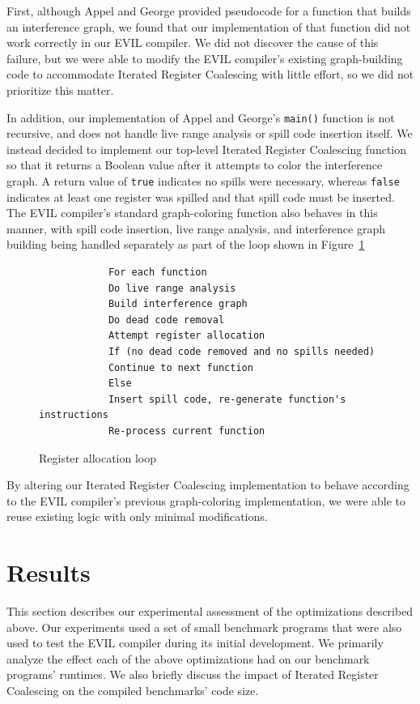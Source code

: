 \documentclass[12pt]{article}
\begin{document}
First, although Appel and George provided pseudocode for a function that builds an interference graph, we found that our implementation of that function did not work correctly in our EVIL compiler.
We did not discover the cause of this failure, but we were able to modify the EVIL compiler's existing graph-building code to accommodate Iterated Register Coalescing with little effort, so we did not prioritize this matter.

In addition, our implementation of Appel and George's {\tt main()} function is not recursive, and does not handle live range analysis or spill code insertion itself.
We instead decided to implement our top-level Iterated Register Coalescing function so that it returns a Boolean value after it attempts to color the interference graph.
A return value of {\tt true} indicates no spills were necessary, whereas {\tt false} indicates at least one register was spilled and that spill code must be inserted.
The EVIL compiler's standard graph-coloring function also behaves in this manner, with spill code insertion, live range analysis, and interference graph building being handled separately as part of the loop shown in Figure~\ref{fig:ircLoop}

\begin{figure}
\begin{verbatim}
            For each function
            Do live range analysis
            Build interference graph
            Do dead code removal
            Attempt register allocation
            If (no dead code removed and no spills needed)
            Continue to next function
            Else
            Insert spill code, re-generate function's instructions
            Re-process current function
\end{verbatim}
\caption{Register allocation loop}
\label{fig:ircLoop}
\end{figure}

By altering our Iterated Register Coalescing implementation to behave according to the EVIL compiler's previous graph-coloring implementation, we were able to reuse existing logic with only minimal modifications.

\section{Results}
This section describes our experimental assessment of the optimizations described above.
Our experiments used a set of small benchmark programs that were also used to test the EVIL compiler during its initial development.
We primarily analyze the effect each of the above optimizations had on our benchmark programs' runtimes.
We also briefly discuss the impact of Iterated Register Coalescing on the compiled benchmarks' code size.
\end{document}
